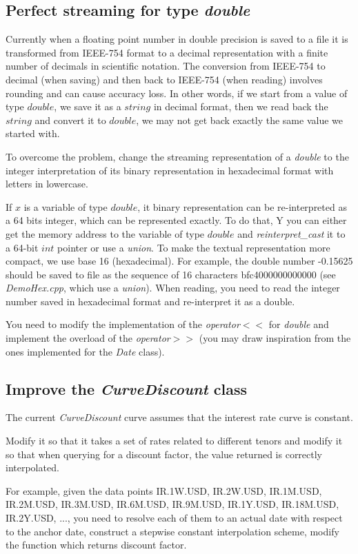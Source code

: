 \documentclass[10pt]{article}
\begin{document}
\subsection{Perfect streaming for type \textit{double}}
Currently when a floating point number in double precision is saved to a file it is transformed from IEEE-754 format to a decimal representation with a finite number of decimals in scientific notation. The conversion from IEEE-754 to decimal (when saving) and then back to IEEE-754 (when reading) involves rounding and can cause accuracy loss. In other words, if we start from a value of type $double$, we save it as a $string$ in decimal format, then we read back the $string$ and convert it to $double$, we may not get back exactly the same value we started with.

To overcome the problem, change the streaming representation of a \textit{double} to the integer interpretation of its binary representation in hexadecimal format with letters in lowercase.

If $x$ is a variable of type $double$, it binary representation can be re-interpreted as a 64 bits integer, which can be represented exactly. To do that, Y
you can either get the memory address to the variable of type $double$ and \textit{reinterpret\_cast} it to a 64-bit $int$ pointer or use a \textit{union}. To make the textual representation more compact, we use base 16 (hexadecimal). For example, the double number -0.15625 should be saved to file as the sequence of 16 characters bfc4000000000000 (see \textit{DemoHex.cpp}, which use a \textit{union}). When reading, you need to read the integer number saved in hexadecimal format and re-interpret it as a double.

You need to modify the implementation of the \textit{operator$<<$} for \textit{double} and implement the overload of the \textit{operator$>>$} (you may draw inspiration from the ones implemented for the \textit{Date} class).

\subsection{Improve the \textit{CurveDiscount} class}
The current \textit{CurveDiscount} curve assumes that the interest rate curve is constant.

Modify it so that it takes a set of rates related to different tenors and modify it so that when querying for a discount factor, the value returned is correctly interpolated.

For example, given the data points {IR.1W.USD, IR.2W.USD, IR.1M.USD, IR.2M.USD, IR.3M.USD, IR.6M.USD, IR.9M.USD, IR.1Y.USD, IR.18M.USD, IR.2Y.USD, ...}, you need to resolve each of them to an actual date with respect to the anchor date, construct a stepwise constant interpolation scheme, modify the function which returns discount factor.
\end{document}
